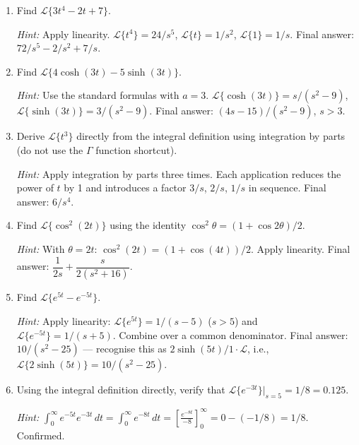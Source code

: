 \documentclass[12pt,a4paper]{article}
\begin{document}
\begin{enumerate}[leftmargin=1.5em, label=\textbf{P\arabic*.}]

\item Find $\mathcal{L}\{3t^4 - 2t + 7\}$.

\textit{Hint:} Apply linearity. $\mathcal{L}\{t^4\} = 24/s^5$, $\mathcal{L}\{t\} = 1/s^2$, $\mathcal{L}\{1\} = 1/s$. Final answer: $72/s^5 - 2/s^2 + 7/s$.

\item Find $\mathcal{L}\{4\cosh(3t) - 5\sinh(3t)\}$.

\textit{Hint:} Use the standard formulas with $a = 3$. $\mathcal{L}\{\cosh(3t)\} = s/(s^2-9)$, $\mathcal{L}\{\sinh(3t)\} = 3/(s^2-9)$. Final answer: $(4s - 15)/(s^2 - 9)$, $s > 3$.

\item Derive $\mathcal{L}\{t^3\}$ directly from the integral definition using integration by parts (do not use the $\Gamma$ function shortcut).

\textit{Hint:} Apply integration by parts three times. Each application reduces the power of $t$ by 1 and introduces a factor $3/s$, $2/s$, $1/s$ in sequence. Final answer: $6/s^4$.

\item Find $\mathcal{L}\{\cos^2(2t)\}$ using the identity $\cos^2\theta = (1 + \cos 2\theta)/2$.

\textit{Hint:} With $\theta = 2t$: $\cos^2(2t) = (1 + \cos(4t))/2$. Apply linearity. Final answer: $\dfrac{1}{2s} + \dfrac{s}{2(s^2+16)}$.

\item Find $\mathcal{L}\{e^{5t} - e^{-5t}\}$.

\textit{Hint:} Apply linearity: $\mathcal{L}\{e^{5t}\} = 1/(s-5)$ ($s > 5$) and $\mathcal{L}\{e^{-5t}\} = 1/(s+5)$. Combine over a common denominator. Final answer: $10/(s^2 - 25)$ --- recognise this as $2\sinh(5t)/1 \cdot \mathcal{L}$, i.e., $\mathcal{L}\{2\sinh(5t)\} = 10/(s^2-25)$.

\item Using the integral definition directly, verify that $\mathcal{L}\{e^{-3t}\}\big|_{s=5} = 1/8 = 0.125$.

\textit{Hint:} $\int_0^{\infty}e^{-5t}e^{-3t}\,dt = \int_0^{\infty}e^{-8t}\,dt = \left[\frac{e^{-8t}}{-8}\right]_0^{\infty} = 0 - (-1/8) = 1/8$. Confirmed.

\end{enumerate}

\end{document}
